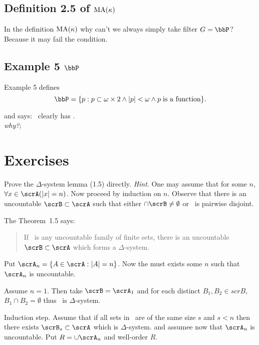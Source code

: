 \subsection{Definition 2.5 of \(\mathop{\rm MA}\nolimits(\kappa)\)}

In the definition \(\mathop{\rm MA}\nolimits(\kappa)\)
why can't we always simply take filter \(G=\bbP\)?\\
Because it may fail the  condition.

\subsection{Example 5 \(\bbP\)}

Example 5 defines
\begin{equation*}
\bbP = \{p: p \subset \omega\times 2 \land |p|<\omega 
  \land p \;\textnormal{is a function}\}.
\end{equation*}

and says: \bbP\ clearly has \ccc. \\
\emph{why?};

\section{Exercises}

\begin{enumerate}

\begin{excopy}
Prove the \(\Delta\)-system lemma (1.5) directly. 
\emph{Hint}. One may assume that for
some $n$, \(\forall x \in \scrA (|x| =n)\). 
Now proceed by induction on $n$. Observe that
there is an uncountable \(\scrB \subset \scrA\) such that either 
\(\cap \scrB \neq \emptyset\) or \scrB\ is pairwise
disjoint.
\end{excopy}

The Theorem~1.5 says:
\begin{quote}
If \scrA\ is any uncountable family of finite sets, there is an uncountable
\(\scrB \subset \scrA\) which forms a \(\Delta\)-system.
\end{quote}
Put \(\scrA_n = \{A \in \scrA: |A|=n\}\).
Now the must exists some $n$ such that \(\scrA_n\) is uncountable.

Assume \(n=1\). Then take \(\scrB = \scrA_1\) 
and for each distinct \(B_1,B_2 \in scrB\), \(B_1\cap B_2 = \emptyset\)
thus \scrB\ is \(\Delta\)-system.

Induction step.
Assume that if all sets in \scrA\ are of the same size $s$ and \(s<n\)
then there exists \(\scrB_s\subset \scrA\) which is \(\Delta\)-system.
and assumee now that \(\scrA_n\) is uncountable.
Put \(R = \cup \scrA_n\) and well-order $R$.

\unfinished


\end{enumerate}
